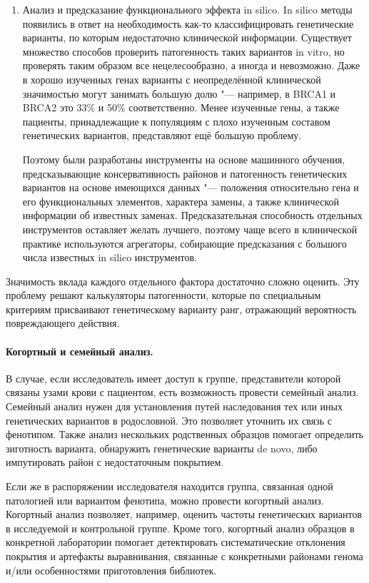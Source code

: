 \documentclass[a4paper,12pt]{article}
\begin{document}
\begin{enumerate}
\item Анализ и предсказание функционального эффекта in silico.
In silico методы появились в ответ на необходимость как-то классифицировать генетические варианты, по которым недостаточно клинической информации.
Существует множество способов проверить патогенность таких вариантов in vitro, но проверять таким образом все нецелесообразно, а иногда и невозможно.
Даже в хорошо изученных генах варианты с неопределённой клинической значимостью могут занимать большую долю "--- например, в BRCA1 и BRCA2 это 33\% и 50\% соответственно.
Менее изученные гены, а также пациенты, принадлежащие к популяциям с плохо изученным составом генетических вариантов, представляют ещё большую проблему.

Поэтому были разработаны инструменты на основе машинного обучения, предсказывающие консервативность районов и патогенность генетических вариантов на основе имеющихся данных "--- положения относительно гена и его функциональных элементов, характера замены, а также клинической информации об известных заменах\cite{j_Brea_Fernandez_2011}.
Предсказательная способность отдельных инструментов оставляет желать лучшего, поэтому чаще всего в клинической практике используются агрегаторы, собирающие предсказания с большого числа известных in silico инструментов.
\end{enumerate}

Значимость вклада каждого отдельного фактора достаточно сложно оценить.
Эту проблему решают калькуляторы патогенности, которые по специальным критериям присваивают генетическому варианту ранг, отражающий вероятность повреждающего действия\cite{Ryzhkova_2017}.

\paragraph{Когортный и семейный анализ.}
В случае, если исследователь имеет доступ к группе, представители которой связаны узами крови с пациентом, есть возможность провести семейный анализ.
Семейный анализ нужен для установления путей наследования тех или иных генетических вариантов в родословной.
Это позволяет уточнить их связь с фенотипом.
Также анализ нескольких родственных образцов помогает определить зиготность варианта, обнаружить генетические варианты de novo, либо импутировать район с недостаточным покрытием.
 
Если же в распоряжении исследователя находится группа, связанная одной патологией или вариантом фенотипа, можно провести когортный анализ.
Когортный анализ позволяет, например, оценить частоты генетических вариантов в исследуемой и контрольной группе.
Кроме того, когортный анализ образцов в конкретной лаборатории помогает детектировать систематические отклонения покрытия и артефакты выравнивания, связанные с конкретными районами генома и/или особенностями приготовления библиотек.
\end{document}

